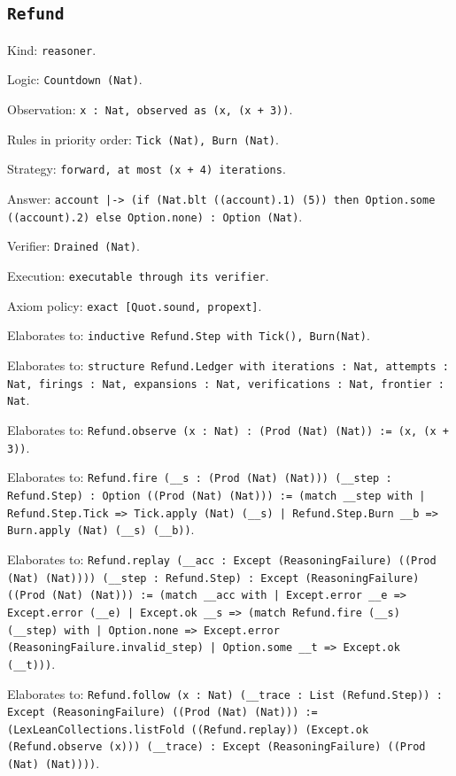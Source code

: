 \documentclass[11pt]{article}
\begin{document}
\subsection*{\texttt{Refund}}
\noindent Kind: \texttt{reasoner}.\par
\noindent Logic: \texttt{Countdown (Nat)}.\par
\noindent Observation: \texttt{x : Nat, observed as (x, (x + 3))}.\par
\noindent Rules in priority order: \texttt{Tick (Nat), Burn (Nat)}.\par
\noindent Strategy: \texttt{forward, at most (x + 4) iterations}.\par
\noindent Answer: \texttt{account |-> (if (Nat.blt ((account).1) (5)) then Option.some ((account).2) else Option.none) : Option (Nat)}.\par
\noindent Verifier: \texttt{Drained (Nat)}.\par
\noindent Execution: \texttt{executable through its verifier}.\par
\noindent Axiom policy: \texttt{exact [Quot.sound, propext]}.\par
\noindent Elaborates to: \texttt{inductive Refund.Step with Tick(), Burn(Nat)}.\par
\noindent Elaborates to: \texttt{structure Refund.Ledger with iterations : Nat, attempts : Nat, firings : Nat, expansions : Nat, verifications : Nat, frontier : Nat}.\par
\noindent Elaborates to: \texttt{Refund.observe (x : Nat) : (Prod (Nat) (Nat)) := (x, (x + 3))}.\par
\noindent Elaborates to: \texttt{Refund.fire (\_\_s : (Prod (Nat) (Nat))) (\_\_step : Refund.Step) : Option ((Prod (Nat) (Nat))) := (match \_\_step with | Refund.Step.Tick => Tick.apply (Nat) (\_\_s) | Refund.Step.Burn \_\_b => Burn.apply (Nat) (\_\_s) (\_\_b))}.\par
\noindent Elaborates to: \texttt{Refund.replay (\_\_acc : Except (ReasoningFailure) ((Prod (Nat) (Nat)))) (\_\_step : Refund.Step) : Except (ReasoningFailure) ((Prod (Nat) (Nat))) := (match \_\_acc with | Except.error \_\_e => Except.error (\_\_e) | Except.ok \_\_s => (match Refund.fire (\_\_s) (\_\_step) with | Option.none => Except.error (ReasoningFailure.invalid\_step) | Option.some \_\_t => Except.ok (\_\_t)))}.\par
\noindent Elaborates to: \texttt{Refund.follow (x : Nat) (\_\_trace : List (Refund.Step)) : Except (ReasoningFailure) ((Prod (Nat) (Nat))) := (LexLeanCollections.listFold ((Refund.replay)) (Except.ok (Refund.observe (x))) (\_\_trace) : Except (ReasoningFailure) ((Prod (Nat) (Nat))))}.\par
\end{document}
